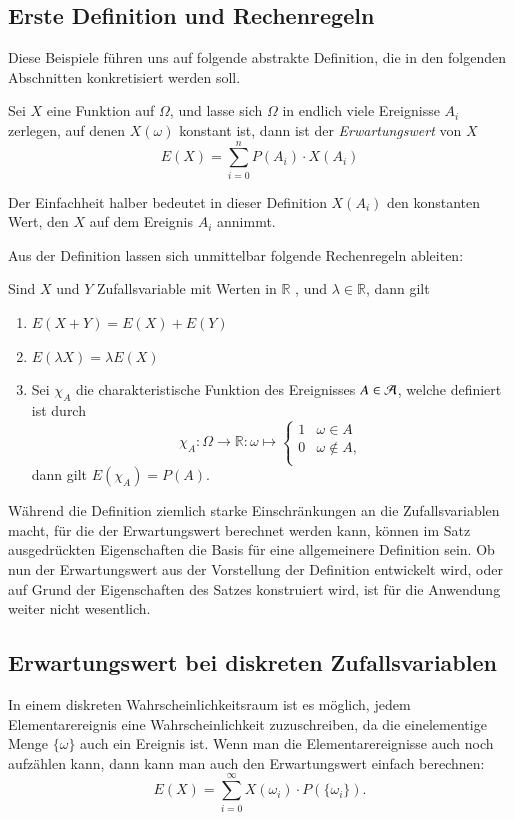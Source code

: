 \subsection{Erste Definition und Rechenregeln}
Diese Beispiele führen uns auf folgende abstrakte Definition,
die in den folgenden Abschnitten konkretisiert werden soll.

\begin{definition}
Sei $X$ eine Funktion auf $\Omega$, und lasse sich $\Omega$ in endlich
viele Ereignisse $A_i$ zerlegen, auf denen $X(\omega)$ konstant ist,
dann ist der {\em Erwartungswert} von $X$
\[
E(X)=\sum_{i=0}^nP(A_i)\cdot X(A_i)
\]
\end{definition}

Der Einfachheit halber bedeutet in dieser Definition $X(A_i)$ den
konstanten Wert, den $X$ auf dem Ereignis $A_i$ annimmt.

Aus der Definition lassen sich unmittelbar folgende Rechenregeln ableiten:
\begin{satz}
\label{rechenregeln-erwartungswert}
Sind $X$ und $Y$ Zufallsvariable mit Werten in $\mathbb{R}$ ,
und $\lambda\in\mathbb{R}$, dann gilt
\begin{enumerate}
\item $E(X+Y)=E(X)+E(Y)$
\item $E(\lambda X)=\lambda E(X)$
\item Sei $\chi_A$ die charakteristische Funktion des Ereignisses $A\in{\cal A}$,
welche definiert ist durch
\[
\chi_A\colon\Omega\to\mathbb{R}:\omega\mapsto\begin{cases}
1&\omega\in A\\
0&\omega\not\in A,\\
\end{cases}
\]
dann gilt $E(\chi_A)=P(A)$.
\end{enumerate}
\end{satz}
Während die Definition ziemlich starke Einschränkungen an die Zufallsvariablen
macht, für die der Erwartungswert berechnet werden kann, können
im Satz ausgedrückten Eigenschaften die Basis für eine allgemeinere
Definition sein.
Ob nun der Erwartungswert aus der Vorstellung der Definition
entwickelt wird, oder auf Grund der Eigenschaften des Satzes konstruiert
wird, ist für die Anwendung weiter nicht wesentlich.

\subsection{Erwartungswert bei diskreten Zufallsvariablen}
In einem diskreten Wahrscheinlichkeitsraum ist es möglich, jedem
Elementarereignis eine Wahrscheinlichkeit zuzuschreiben, da die
einelementige Menge $\{\omega\}$ auch ein Ereignis ist.
Wenn man
die Elementarereignisse auch noch aufzählen kann, dann kann man
auch den Erwartungswert einfach berechnen:
\[
E(X)=\sum_{i=0}^\infty X(\omega_i)\cdot P(\{\omega_i\}).
\]
